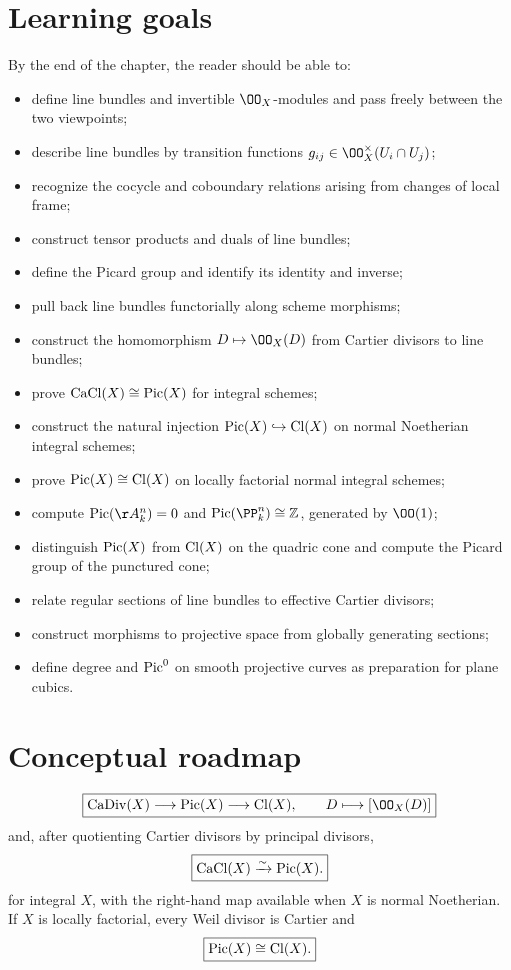 \section*{Learning goals}
By the end of the chapter, the reader should be able to:
\begin{itemize}
\item define line bundles and invertible \(\OO_X\)-modules and pass freely between the two viewpoints;
\item describe line bundles by transition functions \(g_{ij}\in\OO_X^\times(U_i\cap U_j)\);
\item recognize the cocycle and coboundary relations arising from changes of local frame;
\item construct tensor products and duals of line bundles;
\item define the Picard group and identify its identity and inverse;
\item pull back line bundles functorially along scheme morphisms;
\item construct the homomorphism \(D\mapsto\OO_X(D)\) from Cartier divisors to line bundles;
\item prove \(\operatorname{CaCl}(X)\cong\operatorname{Pic}(X)\) for integral schemes;
\item construct the natural injection \(\operatorname{Pic}(X)\hookrightarrow\operatorname{Cl}(X)\) on normal Noetherian integral schemes;
\item prove \(\operatorname{Pic}(X)\cong\operatorname{Cl}(X)\) on locally factorial normal integral schemes;
\item compute \(\Pic(\AA^n_k)=0\) and \(\Pic(\PP^n_k)\cong\mathbb Z\), generated by \(\OO(1)\);
\item distinguish \(\operatorname{Pic}(X)\) from \(\operatorname{Cl}(X)\) on the quadric cone and compute the Picard group of the punctured cone;
\item relate regular sections of line bundles to effective Cartier divisors;
\item construct morphisms to projective space from globally generating sections;
\item define degree and \(\operatorname{Pic}^0\) on smooth projective curves as preparation for plane cubics.
\end{itemize}

\section*{Conceptual roadmap}
\[
\boxed{
\CaDiv(X)\longrightarrow\Pic(X)\longrightarrow\Cl(X),
\qquad
D\longmapsto[\OO_X(D)]
}
\]
and, after quotienting Cartier divisors by principal divisors,
\[
  \boxed{\operatorname{CaCl}(X)\xrightarrow{\sim}\operatorname{Pic}(X).}
\]
for integral \(X\), with the right-hand map available when \(X\) is normal Noetherian.  If \(X\) is locally factorial, every Weil divisor is Cartier and
\[
  \boxed{\operatorname{Pic}(X)\cong\operatorname{Cl}(X).}
\]


